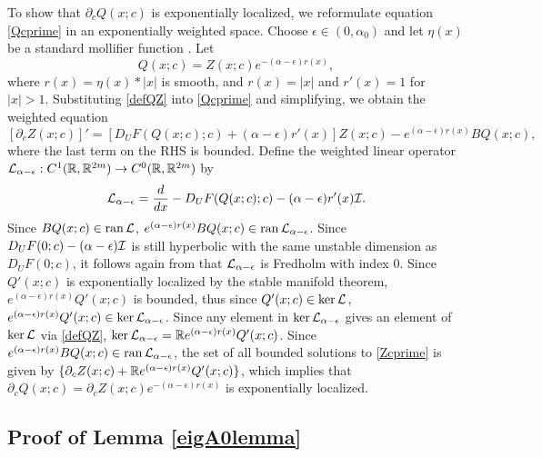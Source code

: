 \documentclass[10pt,reqno]{amsart}
\theoremstyle{plain}
\theoremstyle{definition}
\theoremstyle{remark}
\numberwithin{theorem}{section}
\numberwithin{equation}{section}
\begin{document}
To show that $\partial_c Q(x; c)$ is exponentially localized, we reformulate equation \cref{Qcprime} in an exponentially weighted space. Choose $\epsilon \in (0,\alpha_0)$ and let $\eta(x)$ be a standard mollifier function \cite[Section~C.5]{Evans2010}. Let
\begin{equation}\label{defQZ}
Q(x; c) = Z(x; c) e^{-(\alpha - \epsilon)r(x)},
\end{equation}
where $r(x) = \eta(x) * |x|$ is smooth, and $r(x) = |x|$ and $r'(x) = 1$ for $|x| > 1$. Substituting \cref{defQZ} into \cref{Qcprime} and simplifying, we obtain the weighted equation
\begin{equation}\label{Zcprime}
[\partial_c Z(x; c)]' = [D_U F(Q(x;c); c) + (\alpha - \epsilon) r'(x) ] Z(x; c) - e^{(\alpha - \epsilon)r(x)} B Q(x;c),
\end{equation}
where the last term on the RHS is bounded. Define the weighted linear operator $\mathcal{L}_{\alpha - \epsilon}: C^1(\mathbb{R}, \mathbb{R}^{2m}) \rightarrow C^0(\mathbb{R}, \mathbb{R}^{2m})$ by
\begin{equation}\label{defLtvalpha}
\mathcal{L}_{\alpha - \epsilon} = \frac{d}{dx} - D_U F(Q(x;c); c) - (\alpha - \epsilon) r'(x) \mathcal{I}.
\end{equation}
Since $B Q(x;c) \in \operatorname{ran} \mathcal{L}$, $e^{(\alpha - \epsilon)r(x)} B Q(x;c) \in \operatorname{ran} \mathcal{L}_{\alpha - \epsilon}$. Since $D_U F(0; c)-(\alpha-\epsilon)\mathcal{I}$ is still hyperbolic with the same unstable dimension as $D_U F(0; c)$, it follows again from \cite[Lemma 4.2]{Palmer1984} that $\mathcal{L}_{\alpha - \epsilon}$ is Fredholm with index 0. Since $Q'(x; c)$ is exponentially localized by the stable manifold theorem, $e^{(\alpha - \epsilon)r(x)} Q'(x; c)$ is bounded, thus since $Q'(x; c) \in \mathop\mathrm{ker}\nolimits \mathcal{L}$, $e^{(\alpha - \epsilon)r(x)} Q'(x; c) \in \mathop\mathrm{ker}\nolimits \mathcal{L}_{\alpha - \epsilon}$. Since any element in $\mathop\mathrm{ker}\nolimits \mathcal{L}_{\alpha - \epsilon}$ gives an element of $\mathop\mathrm{ker}\nolimits \mathcal{L}$ via \cref{defQZ}, $\mathop\mathrm{ker}\nolimits \mathcal{L}_{\alpha - \epsilon} = \mathbb{R} e^{(\alpha - \epsilon)r(x)} Q'(x; c)$. Since $e^{(\alpha - \epsilon)r(x)} B Q(x;c) \in \operatorname{ran} \mathcal{L}_{\alpha - \epsilon}$, the set of all bounded solutions to \cref{Zcprime} is given by $\{ \partial_c Z(x; c) + \mathbb{R} e^{(\alpha - \epsilon)r(x)} Q'(x;c) \}$, which implies that $\partial_c Q(x; c) = \partial_c Z (x; c) e^{-(\alpha - \epsilon)r(x)}$ is exponentially localized.

\subsection{Proof of Lemma \ref{eigA0lemma}}
\end{document}
